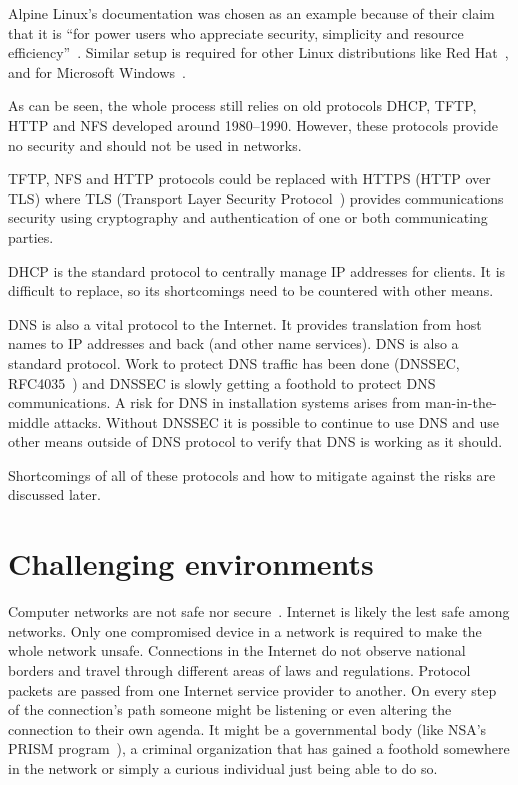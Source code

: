 Alpine Linux's documentation was chosen as an example because of their
claim that it is ``for power users who appreciate security, simplicity
and resource efficiency''~\cite{alpine-about}. Similar setup is
required for other Linux distributions like Red
Hat~\cite{redhat-network-install}, and for Microsoft
Windows~\cite{windows-network-install}.

As can be seen, the whole process still relies on old protocols DHCP,
TFTP, HTTP and NFS developed around 1980--1990. However, these
protocols provide no security and should not be used in
networks.

TFTP, NFS and HTTP protocols could be replaced with HTTPS (HTTP over
TLS) where TLS (Transport Layer Security Protocol~\cite{RFC5246})
provides communications security using cryptography and authentication
of one or both communicating parties.

DHCP is the standard protocol to centrally manage IP addresses for
clients. It is difficult to replace, so its shortcomings need to be
countered with other means.

DNS is also a vital protocol to the Internet. It provides translation
from host names to IP addresses and back (and other name
services). DNS is also a standard protocol. Work to protect DNS
traffic has been done (DNSSEC, RFC4035~\cite{rfc4035}) and DNSSEC is
slowly getting a foothold to protect DNS communications. A risk for
DNS in installation systems arises from man-in-the-middle
attacks. Without DNSSEC it is possible to continue to use DNS and use
other means outside of DNS protocol to verify that DNS is working as
it should.

Shortcomings of all of these protocols and how to mitigate against the
risks are discussed later.

\section{Challenging environments}

Computer networks are not safe nor secure~\cite{beyondcorp}. Internet
is likely the lest safe among networks. Only one compromised device in
a network is required to make the whole network unsafe. Connections in
the Internet do not observe national borders and travel through
different areas of laws and regulations. Protocol packets are passed
from one Internet service provider to another. On every step of the
connection's path someone might be listening or even altering the
connection to their own agenda. It might be a governmental body (like
NSA's PRISM program~\cite{nsa-prism}), a criminal organization that
has gained a foothold somewhere in the network or simply a curious
individual just being able to do so.


